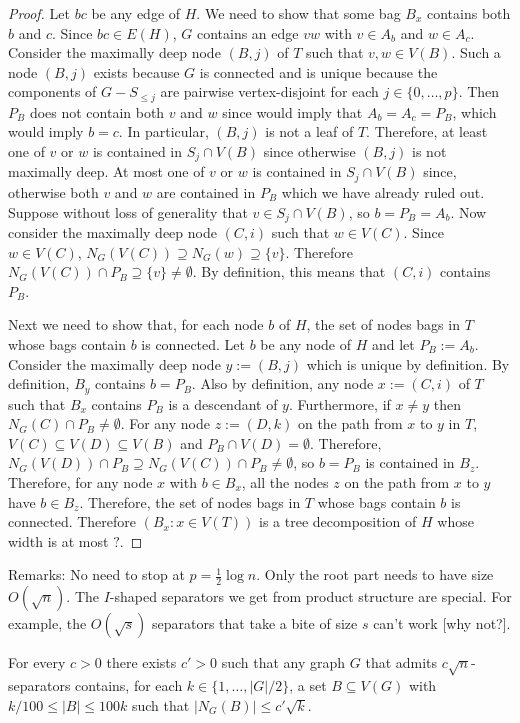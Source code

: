 \documentclass{patmorin}
\renewcommand{\le}{\leqslant}
\begin{document}
\begin{proof}
  Let $bc$ be any edge of $H$. We need to show that some bag $B_x$ contains both $b$ and $c$.  Since $bc\in E(H)$, $G$ contains an edge $vw$ with $v\in A_b$ and $w\in A_c$.  Consider the maximally deep node $(B,j)$ of $T$ such that $v,w\in V(B)$.  Such a node $(B,j)$ exists because $G$ is connected and is unique because the components of $G-S_{\le j}$ are pairwise vertex-disjoint for each $j\in\{0,\ldots,p\}$. Then $P_B$ does not contain both $v$ and $w$ since would imply that $A_b=A_c=P_B$, which would imply $b=c$.  In particular, $(B,j)$ is not a leaf of $T$. Therefore, at least one of $v$ or $w$ is contained in $S_j\cap V(B)$ since otherwise $(B,j)$ is not maximally deep.  At most one of $v$ or $w$ is contained in $S_j\cap V(B)$ since, otherwise both $v$ and $w$ are contained in $P_{B}$ which we have already ruled out.  Suppose without loss of generality that $v\in S_j\cap V(B)$, so $b=P_B=A_b$.  Now consider the maximally deep node $(C,i)$ such that $w\in V(C)$.  Since $w\in V(C)$, $N_G(V(C))\supseteq N_G(w)\supseteq\{v\}$.  Therefore $N_G(V(C))\cap P_B\supseteq\{v\}\neq\emptyset$. By definition, this means that $(C,i)$ contains $P_B$.

  Next we need to show that, for each node $b$ of $H$, the set of nodes bags in $T$ whose bags contain $b$ is connected.  Let $b$ be any node of $H$ and let $P_B:=A_b$.  Consider the maximally deep node $y:=(B,j)$ which is unique by definition. By definition, $B_y$ contains $b=P_B$.  Also by definition, any node $x:=(C,i)$ of $T$ such that $B_x$ contains $P_B$ is a descendant of $y$. Furthermore, if $x\neq y$ then $N_G(C)\cap P_B\neq\emptyset$.  For any node $z:=(D,k)$ on the path from $x$ to $y$ in $T$, $V(C)\subseteq V(D)\subseteq V(B)$ and $P_B\cap V(D)=\emptyset$.  Therefore, $N_G(V(D))\cap P_B\supseteq N_G(V(C))\cap P_B\neq\emptyset$, so $b=P_B$ is contained in $B_z$.  Therefore, for any node $x$ with $b\in B_x$, all the nodes $z$ on the path from $x$ to $y$ have $b\in B_z$.  Therefore, the set of nodes bags in $T$ whose bags contain $b$ is connected.  Therefore $(B_x:x\in V(T))$ is a tree decomposition of $H$ whose width is at most $?$.
\end{proof}

Remarks: No need to stop at $p=\tfrac12\log n$.  Only the root part needs to have size $O(\sqrt{n})$.  The $I$-shaped separators we get from product structure are special.  For example, the $O(\sqrt{s})$ separators that take a bite of size $s$ can't work [why not?].

\begin{lem}
  For every $c>0$ there exists $c'>0$ such that any graph $G$ that admits $c\sqrt{n}$-separators contains, for each $k\in\{1,\ldots,|G|/2\}$, a set $B\subseteq V(G)$ with $k/100\le |B|\le 100k$ such that $|N_G(B)|\le c'\sqrt{k}$.
\end{lem}
\end{document}
